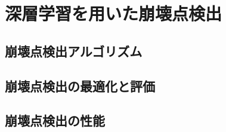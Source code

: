 
\chapter{深層学習を用いた崩壊点検出} \label{chap:VertexFinderwithDL}


\section{崩壊点検出アルゴリズム} \label{VFDL:AlgorithmofVFDL}


\section{崩壊点検出の最適化と評価} \label{VFDL:TuneandPerformanceofVFDL}


\section{崩壊点検出の性能} \label{VFDL:SummaryofVFDL}



























